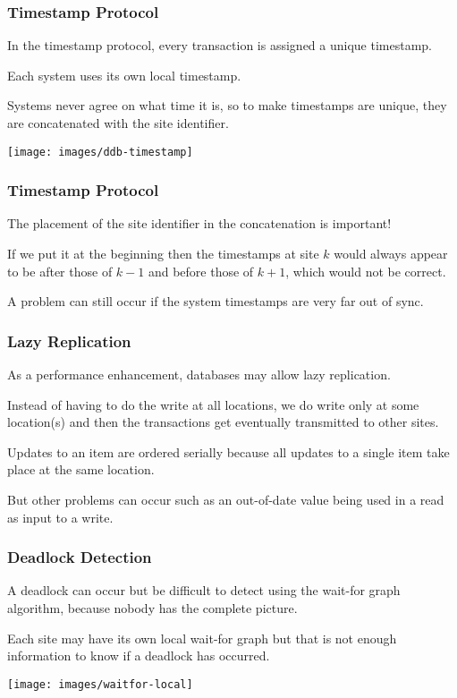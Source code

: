 \begin{frame}
\frametitle{Timestamp Protocol}

In the timestamp protocol, every transaction is assigned a unique timestamp. 

Each system uses its own local timestamp. 

Systems never agree on what time it is, so to make timestamps are unique, they are concatenated with the site identifier.

\begin{center}
\texttt{[image: images/ddb-timestamp]}
\end{center}

\end{frame}

\begin{frame}
\frametitle{Timestamp Protocol}
The placement of the site identifier in the concatenation is important! 

If we put it at the beginning then the timestamps at site $k$ would always appear to be after those of $k-1$ and before those of $k+1$, which would not be correct. 

A problem can still occur if the system timestamps are very far out of sync.

\end{frame}

\begin{frame}
\frametitle{Lazy Replication}
As a performance enhancement, databases may allow lazy replication.

Instead of having to do the write at all locations, we do write only at some location(s) and then the transactions get eventually transmitted to other sites.

Updates to an item are ordered serially because all updates to a single item take place at the same location. 

But other problems can occur such as an out-of-date value being used in a read as input to a write.

\end{frame}

\begin{frame}
\frametitle{Deadlock Detection}

A deadlock can occur but be difficult to detect using the wait-for graph algorithm, because nobody has the complete picture.

Each site may have its own local wait-for graph but that is not enough information to know if a deadlock has occurred.

\begin{center}
\texttt{[image: images/waitfor-local]}
\end{center}

\end{frame}

